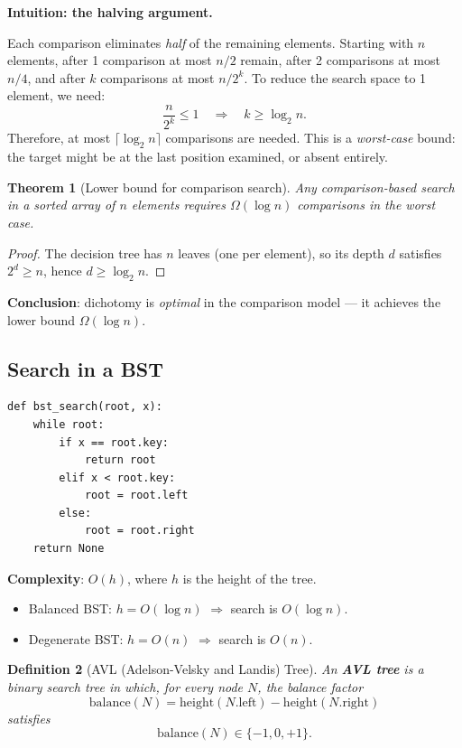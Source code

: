\documentclass[11pt,a4paper]{article}
\newtheorem{theorem}{Theorem}[section]
\newtheorem{definition}[theorem]{Definition}
\newcommand{\bigOmega}{\Omega}
\begin{document}
\textbf{Intuition: the halving argument.}

Each comparison eliminates \emph{half} of the remaining elements. Starting with $n$ elements, after 1 comparison at most $n/2$ remain, after 2 comparisons at most $n/4$, and after $k$ comparisons at most $n/2^k$. To reduce the search space to 1 element, we need:
\[
\frac{n}{2^k} \leq 1 \quad \Longrightarrow \quad k \geq \log_2 n.
\]
Therefore, at most $\lceil \log_2 n \rceil$ comparisons are needed. This is a \emph{worst-case} bound: the target might be at the last position examined, or absent entirely.

\begin{theorem}[Lower bound for comparison search]
Any comparison-based search in a sorted array of $n$ elements requires $\bigOmega(\log n)$ comparisons in the worst case.
\end{theorem}

\begin{proof}
The decision tree has $n$ leaves (one per element), so its depth $d$ satisfies $2^d \geq n$, hence $d \geq \log_2 n$.
\end{proof}

\textbf{Conclusion}: dichotomy is \emph{optimal} in the comparison model --- it achieves the lower bound $\bigOmega(\log n)$.

\subsection{Search in a BST}

\begin{lstlisting}
def bst_search(root, x):
    while root:
        if x == root.key:
            return root
        elif x < root.key:
            root = root.left
        else:
            root = root.right
    return None
\end{lstlisting}

\textbf{Complexity}: $O(h)$, where $h$ is the height of the tree.
\begin{itemize}
    \item Balanced BST: $h = O(\log n)$ $\Rightarrow$ search is $O(\log n)$.
    \item Degenerate BST: $h = O(n)$ $\Rightarrow$ search is $O(n)$.
\end{itemize}

\begin{definition}[AVL (Adelson-Velsky and Landis) Tree]
An \textbf{AVL tree} is a binary search tree in which, for every node $N$, the \emph{balance factor}
\[
\mathrm{balance}(N) = \mathrm{height}(N.\mathrm{left}) - \mathrm{height}(N.\mathrm{right})
\]
satisfies
\[
\mathrm{balance}(N) \in \{-1, 0, +1\}.
\]
\end{definition}
\end{document}

